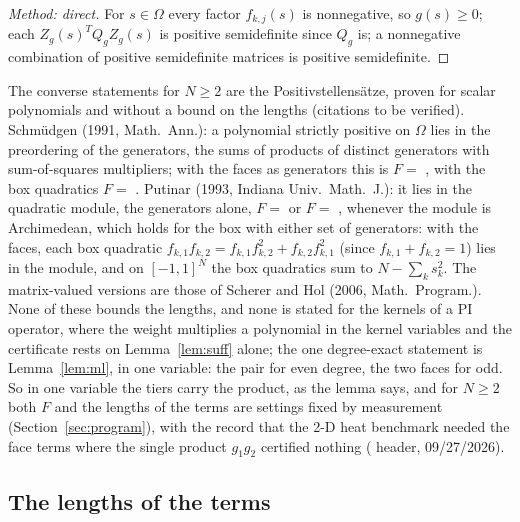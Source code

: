 \begin{proof}[Method: direct]
For $s\in\Omega$ every factor $f_{k,j}(s)$ is nonnegative, so $g(s)\ge0$; each $Z_g(s)^TQ_gZ_g(s)$ is positive semidefinite since $Q_g$ is; a nonnegative combination of positive semidefinite matrices is positive semidefinite.
\end{proof}

The converse statements for $N\ge2$ are the Positivstellens\"atze, proven for scalar polynomials and without a bound on the lengths (citations to be verified). Schm\"udgen (1991, Math.\ Ann.): a polynomial strictly positive on $\Omega$ lies in the preordering of the generators, the sums of products of distinct generators with sum-of-squares multipliers; with the faces as generators this is $F=$ , with the box quadratics $F=$ . Putinar (1993, Indiana Univ.\ Math.\ J.): it lies in the quadratic module, the generators alone, $F=$  or $F=$ , whenever the module is Archimedean, which holds for the box with either set of generators: with the faces, each box quadratic $f_{k,1}f_{k,2}=f_{k,1}f_{k,2}^2+f_{k,2}f_{k,1}^2$ (since $f_{k,1}+f_{k,2}=1$) lies in the module, and on $[-1,1]^N$ the box quadratics sum to $N-\sum_ks_k^2$. The matrix-valued versions are those of Scherer and Hol (2006, Math.\ Program.). None of these bounds the lengths, and none is stated for the kernels of a PI operator, where the weight multiplies a polynomial in the kernel variables and the certificate rests on Lemma~\ref{lem:suff} alone; the one degree-exact statement is Lemma~\ref{lem:ml}, in one variable: the pair for even degree, the two faces for odd. So in one variable the tiers carry the product, as the lemma says, and for $N\ge2$ both $F$ and the lengths of the terms are settings fixed by measurement (Section~\ref{sec:program}), with the record that the 2-D heat benchmark needed the face terms where the single product $g_1g_2$ certified nothing ( header, 09/27/2026).

\subsection{The lengths of the terms}\label{sec:d4}

